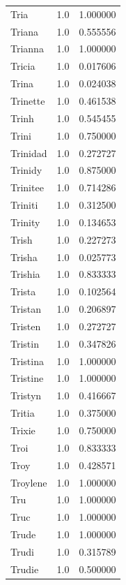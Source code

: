 \documentclass[
  letterpaper,
  DIV=11,
  numbers=noendperiod]{scrreprt}
\begin{document}
\begin{tabular}{lrr}
Tria            &   1.0 &   1.000000 \\
Triana          &   1.0 &   0.555556 \\
Trianna         &   1.0 &   1.000000 \\
Tricia          &   1.0 &   0.017606 \\
Trina           &   1.0 &   0.024038 \\
Trinette        &   1.0 &   0.461538 \\
Trinh           &   1.0 &   0.545455 \\
Trini           &   1.0 &   0.750000 \\
Trinidad        &   1.0 &   0.272727 \\
Trinidy         &   1.0 &   0.875000 \\
Trinitee        &   1.0 &   0.714286 \\
Triniti         &   1.0 &   0.312500 \\
Trinity         &   1.0 &   0.134653 \\
Trish           &   1.0 &   0.227273 \\
Trisha          &   1.0 &   0.025773 \\
Trishia         &   1.0 &   0.833333 \\
Trista          &   1.0 &   0.102564 \\
Tristan         &   1.0 &   0.206897 \\
Tristen         &   1.0 &   0.272727 \\
Tristin         &   1.0 &   0.347826 \\
Tristina        &   1.0 &   1.000000 \\
Tristine        &   1.0 &   1.000000 \\
Tristyn         &   1.0 &   0.416667 \\
Tritia          &   1.0 &   0.375000 \\
Trixie          &   1.0 &   0.750000 \\
Troi            &   1.0 &   0.833333 \\
Troy            &   1.0 &   0.428571 \\
Troylene        &   1.0 &   1.000000 \\
Tru             &   1.0 &   1.000000 \\
Truc            &   1.0 &   1.000000 \\
Trude           &   1.0 &   1.000000 \\
Trudi           &   1.0 &   0.315789 \\
Trudie          &   1.0 &   0.500000 \\

\end{tabular}
\end{document}
